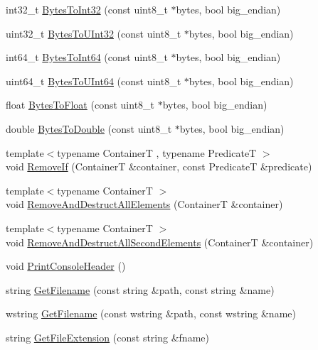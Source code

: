 \begin{DoxyCompactItemize}
\item 
int32\+\_\+t \hyperlink{namespacemage_a274862b36cabc10b90dd7148d42a29a6}{Bytes\+To\+Int32} (const uint8\+\_\+t $\ast$bytes, bool big\+\_\+endian)
\item 
uint32\+\_\+t \hyperlink{namespacemage_a46a019c7f927a6f559b36a8b5c01ab9c}{Bytes\+To\+U\+Int32} (const uint8\+\_\+t $\ast$bytes, bool big\+\_\+endian)
\item 
int64\+\_\+t \hyperlink{namespacemage_a09884643d0e3afe8591f9104785ce480}{Bytes\+To\+Int64} (const uint8\+\_\+t $\ast$bytes, bool big\+\_\+endian)
\item 
uint64\+\_\+t \hyperlink{namespacemage_a93f1f8baabf199005ea96e0a2b6941e3}{Bytes\+To\+U\+Int64} (const uint8\+\_\+t $\ast$bytes, bool big\+\_\+endian)
\item 
float \hyperlink{namespacemage_a5e41913a3a1613add8511e5834e09277}{Bytes\+To\+Float} (const uint8\+\_\+t $\ast$bytes, bool big\+\_\+endian)
\item 
double \hyperlink{namespacemage_af85b8ba1e336f37fc8fe34a53e981a6c}{Bytes\+To\+Double} (const uint8\+\_\+t $\ast$bytes, bool big\+\_\+endian)
\item 
{\footnotesize template$<$typename ContainerT , typename PredicateT $>$ }\\void \hyperlink{namespacemage_a403ff95eb779de1fbbf139661feb2d1b}{Remove\+If} (ContainerT \&container, const PredicateT \&predicate)
\item 
{\footnotesize template$<$typename ContainerT $>$ }\\void \hyperlink{namespacemage_a56c8c38aee820faf885024ed22e70a8e}{Remove\+And\+Destruct\+All\+Elements} (ContainerT \&container)
\item 
{\footnotesize template$<$typename ContainerT $>$ }\\void \hyperlink{namespacemage_aa3db059e4b0563e46cdf3a3a369c3288}{Remove\+And\+Destruct\+All\+Second\+Elements} (ContainerT \&container)
\item 
void \hyperlink{namespacemage_a064756443bd8a1af6974f22c81d29ed0}{Print\+Console\+Header} ()
\item 
string \hyperlink{namespacemage_a74d063f352449eb92ca6d5faabb2f3cf}{Get\+Filename} (const string \&path, const string \&name)
\item 
wstring \hyperlink{namespacemage_aba14856287af620017274f19a4dda596}{Get\+Filename} (const wstring \&path, const wstring \&name)
\item 
string \hyperlink{namespacemage_aec46035d0a6e15632a44ac88619fb675}{Get\+File\+Extension} (const string \&fname)

\end{DoxyCompactItemize}
